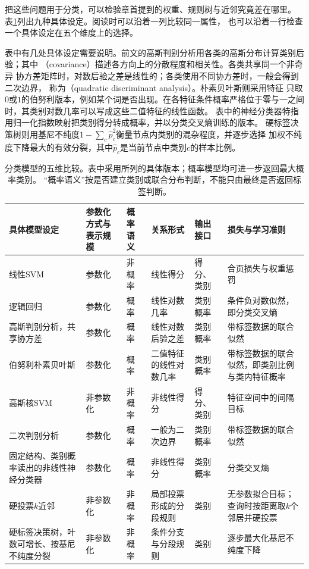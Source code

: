 把这些问题用于分类，可以检验章首提到的权重、规则树与近邻究竟差在哪里。
表\ref{tab:models-classifiers}列出九种具体设定。阅读时可以沿着一列比较同一属性，
也可以沿着一行检查一个具体设定在五个维度上的选择。

表中有几处具体设定需要说明。前文的高斯判别分析用各类的高斯分布计算类别后验；其中
（covariance）描述各方向上的分散程度和相关性。各类共享同一个非奇异
协方差矩阵时，对数后验之差是线性的；各类使用不同协方差时，一般会得到二次边界，
称为（quadratic discriminant analysis）。朴素贝叶斯则采用特征
只取$0$或$1$的伯努利版本，例如某个词是否出现。在各特征条件概率严格位于零与一之间
时，其类别对数几率可以写成这些二值特征的线性函数。
表中的神经分类器特指用归一化指数映射把类别得分转成概率，并以分类交叉熵训练的版本。
硬标签决策树则用基尼不纯度$1-\sum_c\hat p_c^2$衡量节点内类别的混杂程度，并逐步选择
加权不纯度下降最大的有效分裂，其中$\hat p_c$是当前节点中类别$c$的样本比例。

\begin{table}[htbp]
  \centering
  \footnotesize
  \setlength{\tabcolsep}{4pt}
  \renewcommand{\arraystretch}{1.25}
  \begin{tabularx}{\linewidth}{@{}>{\raggedright\arraybackslash}p{28mm}>{\raggedright\arraybackslash}p{16mm}>{\raggedright\arraybackslash}p{11mm}>{\raggedright\arraybackslash}p{23mm}>{\raggedright\arraybackslash}p{22mm}>{\raggedright\arraybackslash}X@{}}
    \toprule
    \textbf{具体模型设定} & \textbf{参数化方式与表示规模} & \textbf{概率语义} & \textbf{关系形式} & \textbf{输出接口} & \textbf{损失与学习准则} \\
    \midrule
    线性SVM & 参数化 & 非概率 & 线性得分 & 得分、类别 & 合页损失与权重惩罚 \\
    逻辑回归 & 参数化 & 概率 & 线性对数几率 & 类别概率 & 条件负对数似然，即分类交叉熵 \\
    高斯判别分析，共享协方差 & 参数化 & 概率 & 线性对数后验之差 & 类别概率 & 带标签数据的联合似然 \\
    伯努利朴素贝叶斯 & 参数化 & 概率 & 二值特征的线性对数几率 & 类别概率 & 带标签数据的联合似然，即类别比例与类内特征概率 \\
    高斯核SVM & 非参数化 & 非概率 & 非线性得分 & 得分、类别 & 特征空间中的间隔目标 \\
    二次判别分析 & 参数化 & 概率 & 一般为二次边界 & 类别概率 & 带标签数据的联合似然 \\
    固定结构、类别概率读出的非线性神经分类器 & 参数化 & 概率 & 非线性得分 & 类别概率 & 分类交叉熵 \\
    硬投票$k$近邻 & 非参数化 & 非概率 & 局部投票形成的分段规则 & 类别 & 无参数拟合目标；查询时按距离取$k$个邻居并硬投票 \\
    硬标签决策树，叶数可增长、按基尼不纯度分裂 & 非参数化 & 非概率 & 条件分支与分段规则 & 类别 & 逐步最大化基尼不纯度下降 \\
    \bottomrule
  \end{tabularx}
  \caption{分类模型的五维比较。表中采用所列的具体版本；概率模型均可进一步返回最大概率类别。
  “概率语义”按是否建立类别或联合分布判断，不能只由最终是否返回标签判断。}
  \label{tab:models-classifiers}
\end{table}
\FloatBarrier

